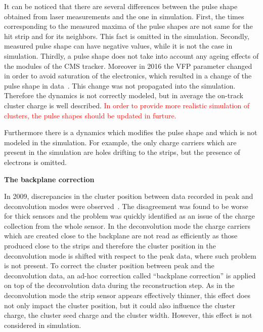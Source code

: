 It can be noticed that there are several differences between the pulse shape obtained from laser measurements and the one in simulation. First, the times corresponding to the measured maxima of the pulse shapes are not same for the hit strip and for its neighbors. This fact is omitted in the simulation. Secondly, measured pulse shape can have negative values, while it is not the case in simulation. Thirdly, a pulse shape does not take into account any ageing effects of the modules of the CMS tracker. Moreover in 2016 the VFP parameter changed in order to avoid saturation of the electronics, which resulted in a change of the pulse shape in data~\cite{website:vfp}. This change was not propagated into the simulation. Therefore the dynamics is not correctly modeled, but in average the on-track cluster charge is well described. \textcolor{red}{In order to provide more realistic simulation of clusters, the pulse shapes should be updated in furture.} 

Furthermore there is a dynamics which modifies the pulse shape and which is not modeled in the simulation. For example, the only charge carriers which are present in the simulation are holes drifting to the strips, but the presence of electrons is omitted.

\textbf{The backplane correction}

In 2009, discrepancies in the cluster position between data recorded in peak and deconvolution modes were observed~\cite{website:backplane}. The disagreement was found to be worse for thick sensors and the problem was quickly identified as an issue of the charge collection from the whole sensor. In the deconvolution mode the charge carriers which are created close to the backplane are not read as efficiently as those produced close to the strips and therefore the cluster position in the deconvolution mode is shifted with respect to the peak data, where such problem is not present. To correct the cluster position between peak and the deconvolution data, an ad-hoc correction called ``backplane correction'' is applied on top of the deconvolution data during the reconstruction step. As in the deconvolution mode the strip sensor appears effectively thinner, this effect does not only impact the cluster position, but it could also influence the cluster charge, the cluster seed charge and the cluster width. However, this effect is not considered in simulation.




